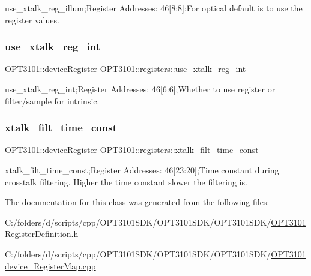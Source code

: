 use\+\_\+xtalk\+\_\+reg\+\_\+illum;Register Addresses\+: 46\mbox{[}8\+:8\mbox{]};For optical default is to use the register values. 

\mbox{\label{class_o_p_t3101_1_1registers_ad52eabf99587324f45d95c70ed4b2b2e}} 
\subsubsection{\texorpdfstring{use\+\_\+xtalk\+\_\+reg\+\_\+int}{use\_xtalk\_reg\_int}}
{\footnotesize\ttfamily \mbox{\hyperlink{class_o_p_t3101_1_1device_register}{O\+P\+T3101\+::device\+Register}} O\+P\+T3101\+::registers\+::use\+\_\+xtalk\+\_\+reg\+\_\+int}



use\+\_\+xtalk\+\_\+reg\+\_\+int;Register Addresses\+: 46\mbox{[}6\+:6\mbox{]};Whether to use register or filter/sample for intrinsic. 

\mbox{\label{class_o_p_t3101_1_1registers_a83b64e27fde47db7e3553055be4a2328}} 
\subsubsection{\texorpdfstring{xtalk\+\_\+filt\+\_\+time\+\_\+const}{xtalk\_filt\_time\_const}}
{\footnotesize\ttfamily \mbox{\hyperlink{class_o_p_t3101_1_1device_register}{O\+P\+T3101\+::device\+Register}} O\+P\+T3101\+::registers\+::xtalk\+\_\+filt\+\_\+time\+\_\+const}



xtalk\+\_\+filt\+\_\+time\+\_\+const;Register Addresses\+: 46\mbox{[}23\+:20\mbox{]};Time constant during crosstalk filtering. Higher the time constant slower the filtering is. 



The documentation for this class was generated from the following files\+:\begin{DoxyCompactItemize}
\item 
C\+:/folders/d/scripts/cpp/\+O\+P\+T3101\+S\+D\+K/\+O\+P\+T3101\+S\+D\+K/\+O\+P\+T3101\+S\+D\+K/\mbox{\hyperlink{_o_p_t3101_register_definition_8h}{O\+P\+T3101\+Register\+Definition.\+h}}\item 
C\+:/folders/d/scripts/cpp/\+O\+P\+T3101\+S\+D\+K/\+O\+P\+T3101\+S\+D\+K/\+O\+P\+T3101\+S\+D\+K/\mbox{\hyperlink{_o_p_t3101device___register_map_8cpp}{O\+P\+T3101device\+\_\+\+Register\+Map.\+cpp}}\end{DoxyCompactItemize}
